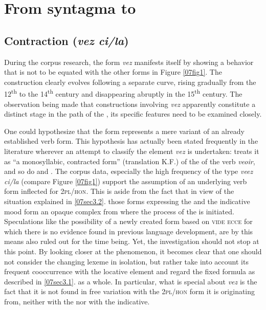 \documentclass[output=paper,colorlinks,citecolor=brown]{langscibook}
\begin{document}
\section{From syntagma to } \label{07sec4}

\subsection{Contraction (\emph{vez ci/la})} \label{07sec4.1}

During the corpus research, the form \emph{vez} manifests itself by showing a behavior that is not to be equated with the other forms in Figure \ref{07fig1}. The  construction clearly evolves following a separate curve, rising gradually from the 12\textsuperscript{th} to the 14\textsuperscript{th} century and disappearing abruptly in the 15\textsuperscript{th} century. The observation being made that constructions involving \emph{vez} apparently constitute a distinct stage in the  path of the , its specific features need to be examined closely.

One could hypothesize that the form represents a mere variant of an already established verb form. This hypothesis has actually been stated frequently in the literature wherever an attempt to classify the element \emph{vez} is undertaken: \citet[311]{buridant2000} treats it as ``a monosyllabic, contracted form'' (translation K.F.) of the   of the verb \emph{veoir}, and so do \citet[80]{oppermann-marsaux2006} and \citet[48]{daninowolfsgruberjoffre2020}. The corpus data, especially the high frequency of the type \emph{veez ci/la} (compare Figure \ref{07fig1}) support the assumption of an underlying verb form inflected for \textsc{2pl/hon}. This is aside from the fact that in view of the situation explained in \ref{07sec3.2}. those forms expressing the  and the indicative mood form an opaque complex from where the  process of the  is initiated. Speculations like the possibility of a newly created form based on  \textsc{vide ecce} \citep[vol. 14, 429]{few1922} for which there is no evidence found in previous language development, are by this means also ruled out for the time being. Yet, the investigation should not stop at this point. By looking closer at the phenomenon, it becomes clear that one should not consider the changing lexeme in isolation, but rather take into account its frequent cooccurrence with the locative element and regard the fixed formula as described in \ref{07sec3.1}. as a whole. In particular, what is special about \emph{vez} is the fact that it is not found in free variation with the 2\textsc{pl/hon} form it is originating from, neither with the  nor with the indicative.
\end{document}
